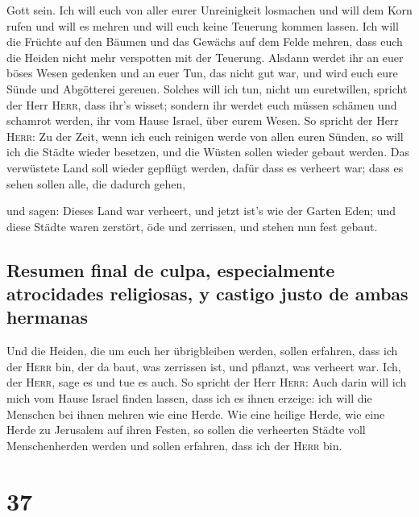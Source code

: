 Gott sein.  Ich will euch von aller eurer Unreinigkeit
losmachen und will dem Korn rufen und will es mehren und will euch keine
Teuerung kommen lassen.  Ich will die Früchte auf den
Bäumen und das Gewächs auf dem Felde mehren, dass euch die Heiden nicht
mehr verspotten mit der Teuerung.  Alsdann werdet ihr an
euer böses Wesen gedenken und an euer Tun, das nicht gut war, und wird
euch eure Sünde und Abgötterei gereuen.  Solches will ich
tun, nicht um euretwillen, spricht der Herr \textsc{Herr}, dass ihr's
wisset; sondern ihr werdet euch müssen schämen und schamrot werden, ihr
vom Hause Israel, über eurem Wesen.  So spricht der Herr
\textsc{Herr}: Zu der Zeit, wenn ich euch reinigen werde von allen euren
Sünden, so will ich die Städte wieder besetzen, und die Wüsten sollen
wieder gebaut werden.  Das verwüstete Land soll wieder
gepflügt werden, dafür dass es verheert war; dass es sehen sollen alle,
die dadurch gehen,

 und sagen: Dieses Land war verheert, und jetzt ist's wie
der Garten Eden; und diese Städte waren zerstört, öde und zerrissen, und
stehen nun fest gebaut.

\hypertarget{resumen-final-de-culpa-especialmente-atrocidades-religiosas-y-castigo-justo-de-ambas-hermanas}{%
\subsection{Resumen final de culpa, especialmente atrocidades
religiosas, y castigo justo de ambas
hermanas}\label{resumen-final-de-culpa-especialmente-atrocidades-religiosas-y-castigo-justo-de-ambas-hermanas}}

 Und die Heiden, die um euch her übrigbleiben werden,
sollen erfahren, dass ich der \textsc{Herr} bin, der da baut, was
zerrissen ist, und pflanzt, was verheert war. Ich, der \textsc{Herr},
sage es und tue es auch.  So spricht der Herr
\textsc{Herr}: Auch darin will ich mich vom Hause Israel finden lassen,
dass ich es ihnen erzeige: ich will die Menschen bei ihnen mehren wie
eine Herde.  Wie eine heilige Herde, wie eine Herde zu
Jerusalem auf ihren Festen, so sollen die verheerten Städte voll
Menschenherden werden und sollen erfahren, dass ich der \textsc{Herr}
bin.

\hypertarget{section-36}{%
\section{37}\label{section-36}}

